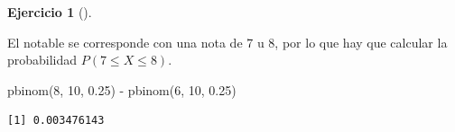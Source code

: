 \documentclass[
  a4paper,
]{scrreport}
\newenvironment{Shaded}{\begin{snugshade}}{\end{snugshade}}
\newcommand{\DecValTok}[1]{\textcolor[rgb]{0.68,0.00,0.00}{#1}}
\newcommand{\FloatTok}[1]{\textcolor[rgb]{0.68,0.00,0.00}{#1}}
\newcommand{\FunctionTok}[1]{\textcolor[rgb]{0.28,0.35,0.67}{#1}}
\newcommand{\NormalTok}[1]{\textcolor[rgb]{0.00,0.23,0.31}{#1}}
\newcommand{\SpecialCharTok}[1]{\textcolor[rgb]{0.37,0.37,0.37}{#1}}
\theoremstyle{definition}
\newtheorem{exercise}{Ejercicio}[chapter]
\theoremstyle{remark}
\begin{document}
\begin{exercise}[]
\begin{enumerate}
\begin{tcolorbox}
  El notable se corresponde con una nota de 7 u 8, por lo que hay que
  calcular la probabilidad \(P(7\leq X\leq 8)\).

\begin{Shaded}
\begin{Highlighting}[]
\FunctionTok{pbinom}\NormalTok{(}\DecValTok{8}\NormalTok{, }\DecValTok{10}\NormalTok{, }\FloatTok{0.25}\NormalTok{) }\SpecialCharTok{{-}} \FunctionTok{pbinom}\NormalTok{(}\DecValTok{6}\NormalTok{, }\DecValTok{10}\NormalTok{, }\FloatTok{0.25}\NormalTok{)}
\end{Highlighting}
\end{Shaded}

\begin{verbatim}
[1] 0.003476143
\end{verbatim}

  \end{tcolorbox}
\end{enumerate}

\end{exercise}
\end{document}
